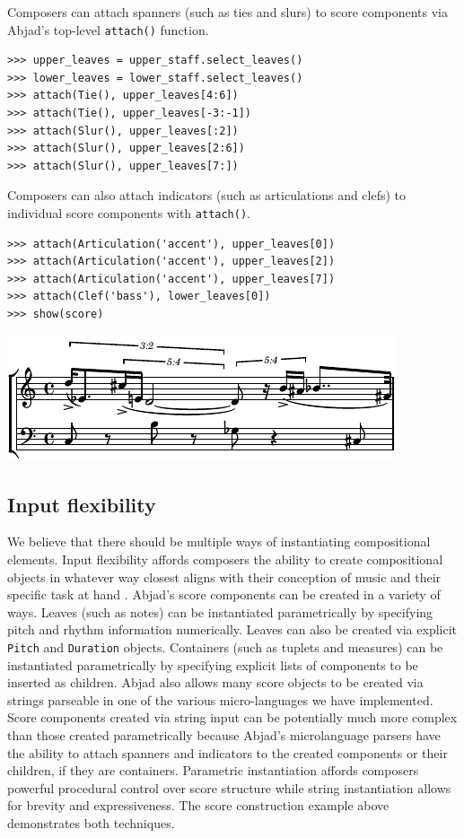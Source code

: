 \documentclass{article}
\begin{document}
Composers can attach spanners (such as ties and slurs) to score components via
Abjad's top-level \texttt{attach()} function.

\begin{lstlisting}
>>> upper_leaves = upper_staff.select_leaves()
>>> lower_leaves = lower_staff.select_leaves()
>>> attach(Tie(), upper_leaves[4:6])
>>> attach(Tie(), upper_leaves[-3:-1])
>>> attach(Slur(), upper_leaves[:2])
>>> attach(Slur(), upper_leaves[2:6])
>>> attach(Slur(), upper_leaves[7:])
\end{lstlisting}


Composers can also attach indicators (such as articulations and clefs) to
individual score components with \texttt{attach()}.

\begin{lstlisting}
>>> attach(Articulation('accent'), upper_leaves[0])
>>> attach(Articulation('accent'), upper_leaves[2])
>>> attach(Articulation('accent'), upper_leaves[7])
>>> attach(Clef('bass'), lower_leaves[0])
>>> show(score)
\end{lstlisting}

\noindent\includegraphics[scale=1.0]{images/abjad-2.pdf}


\subsection{Input flexibility}

We believe that there should be multiple ways of instantiating compositional
elements. Input flexibility affords composers the ability to create
compositional objects in whatever way closest aligns with their conception of
music and their specific task at hand \cite{Kay:1996vn}. Abjad's score components
can be created in a variety of ways. Leaves (such as notes) can be instantiated
parametrically by specifying pitch and rhythm information numerically. Leaves
can also be created via explicit \texttt{Pitch} and \texttt{Duration} objects.
Containers (such as tuplets and measures) can be instantiated parametrically by
specifying explicit lists of components to be inserted as children. Abjad also
allows many score objects to be created via strings parseable in one of the
various micro-languages we have implemented. Score components created via
string input can be potentially much more complex than those created
parametrically because Abjad's microlanguage parsers have the ability to attach
spanners and indicators to the created components or their children, if they
are containers. Parametric instantiation affords composers powerful procedural
control over score structure while string instantiation allows for brevity and
expressiveness. The score construction example above demonstrates both
techniques. 
\end{document}
